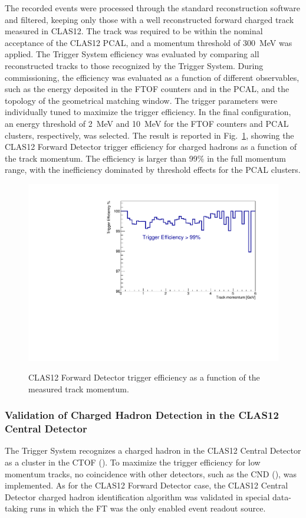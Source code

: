 The recorded events were processed through the standard reconstruction software and filtered, keeping
only those with a well reconstructed forward charged track measured in CLAS12. The track was required
to be within the nominal acceptance of the CLAS12 PCAL, and a momentum threshold of 300~MeV was applied.
The Trigger System efficiency was evaluated by comparing all reconstructed tracks to those recognized by
the Trigger System. During commissioning, the efficiency was evaluated as a function of different observables,
such as the energy deposited in the FTOF counters and in the PCAL, and the topology of the geometrical
matching window. The trigger parameters were individually tuned to maximize the trigger efficiency. In the
final configuration, an energy threshold of 2~MeV and 10~MeV for the FTOF counters and PCAL clusters,
respectively, was selected. The result is reported in Fig.~\ref{fig:FD_TrackEfficiency}, showing the CLAS12
Forward Detector trigger efficiency for charged hadrons as a function of the track momentum. The efficiency
is larger than 99\% in the full momentum range, with the inefficiency dominated by threshold effects for
the PCAL clusters.

\begin{figure}[!htb]
 \centering
{\includegraphics[width=.5\textwidth]{img/FD_TrackEfficiency.pdf}}
 \caption{CLAS12 Forward Detector trigger efficiency as a function of the measured track momentum.}
 \label{fig:FD_TrackEfficiency}
\end{figure}

\subsubsection{Validation of Charged Hadron Detection in the CLAS12 Central Detector}

The Trigger System recognizes a charged hadron in the CLAS12 Central Detector as a cluster in the CTOF
(\cite{ctof-ref}). To maximize the trigger efficiency for low momentum tracks, no coincidence with other
detectors, such as the CND (\cite{cnd-ref}), was implemented. As for the CLAS12 Forward Detector case,
the CLAS12 Central Detector charged hadron identification algorithm was validated in special data-taking
runs in which the FT was the only enabled event readout source. 

